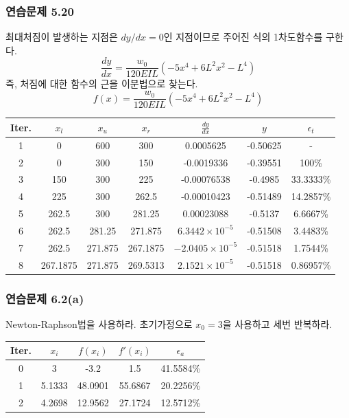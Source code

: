 \subsubsection{연습문제 5.20}
최대처짐이 발생하는 지점은 $dy/dx=0$인 지점이므로 주어진 식의 1차도함수를 구한다.
\begin{equation}
\frac{dy}{dx}=\frac{w_{0}}{120EIL}\left(-5x^{4}+6L^{2}x^{2}-L^{4}\right)
\end{equation}
즉, 처짐에 대한 함수의 근을 이분법으로 찾는다.
\begin{equation}
f(x)=\frac{w_{0}}{120EIL}\left(-5x^{4}+6L^{2}x^{2}-L^{4}\right)
\end{equation}

\begin{table}[!hbpt]
\centering
\begin{tabular}{c|c|c|c|c|c|c}
\hline\hline
Iter.&$x_{l}$&$x_{u}$&$x_{r}$&$\frac{dy}{dx}$&$y$&$\epsilon_{t}$\\
\hline
1&0&600&300&0.0005625&-0.50625&-\\
2&0&300&150&-0.0019336&-0.39551&100\%\\
3&150&300&225&-0.00076538&-0.4985&33.3333\%\\
4&225&300&262.5&-0.00010423&-0.51489&14.2857\%\\
5&262.5&300&281.25&0.00023088&-0.5137&6.6667\%\\
6&262.5&281.25&271.875&$6.3442\times 10^{-5}$&-0.51508&3.4483\%\\
7&262.5&271.875&267.1875&$-2.0405\times 10^{-5}$&-0.51518&1.7544\%\\
8&267.1875&271.875&269.5313&$2.1521\times 10^{-5}$&-0.51518&0.86957\%\\
\hline\hline
\end{tabular}
\end{table}
\clearpage
\subsubsection{연습문제 6.2(a)}
Newton-Raphson법을 사용하라. 초기가정으로 $x_0 =3$을 사용하고 세번 반복하라.
\begin{table}[!hbpt]
\centering
\begin{tabular}{c|c|c|c|c}
\hline\hline
Iter.&$x_{i}$&$f(x_{i})$&$f'(x_{i})$&$\epsilon_{a}$\\
\hline
0&3&-3.2&1.5&41.5584\%\\
1&5.1333&48.0901&55.6867&20.2256\%\\
2&4.2698&12.9562&27.1724&12.5712\%\\
\hline\hline
\end{tabular}
\end{table}

